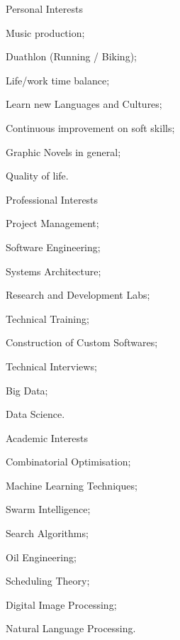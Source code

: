 \noindent
\vspace{-0.3cm}
\begin{multicols*}{3}
\begin{cventries}
\noindent
\cventry
   {Personal Interests}{}{}{}
   {
     \begin{cvitems}
       \item Music production;
       \item Duathlon (Running / Biking);
       \item Life/work time balance;
       \item Learn new Languages and Cultures;
       \item Continuous improvement on soft skills;
       \item Graphic Novels in general;
       \item Quality of life.
       \end{cvitems}
   }
\end{cventries}
\columnbreak
\begin{cventries}
\noindent
\cventry
    {Professional Interests}{}{}{}
    {
      \begin{cvitems}
        \item Project Management;
        \item Software Engineering;
        \item Systems Architecture;
        \item Research and Development Labs;
        \item Technical Training;
        \item Construction of Custom Softwares;
        \item Technical Interviews;
        \item Big Data;
        \item Data Science.
      \end{cvitems}
    }
\end{cventries}
\columnbreak
\begin{cventries}
\noindent
\cventry
    {Academic Interests}{}{}{}
    {
      \begin{cvitems}
        \item Combinatorial Optimisation;
        \item Machine Learning Techniques;
        \item Swarm Intelligence;
        \item Search Algorithms;
        \item Oil Engineering;
        \item Scheduling Theory;
        \item Digital Image Processing;
        \item Natural Language Processing.
      \end{cvitems}
    }
\end{cventries}
\end{multicols*}












